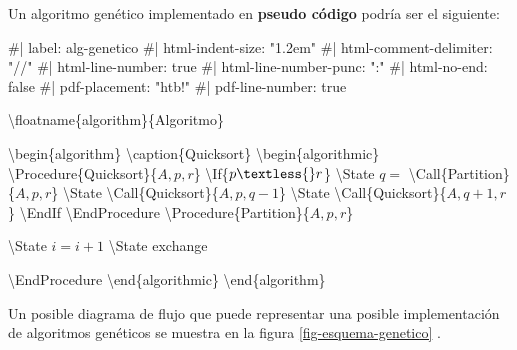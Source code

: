 \documentclass[
  a4paper,
  DIV=11,
  numbers=noendperiod]{scrreprt}
\newenvironment{Shaded}{\begin{snugshade}}{\end{snugshade}}
\newcommand{\NormalTok}[1]{#1}
\begin{document}
Un algoritmo genético implementado en \textbf{pseudo código} podría ser
el siguiente:

\begin{Shaded}
\begin{Highlighting}[numbers=left,,]
\NormalTok{\#| label: alg{-}genetico}
\NormalTok{\#| html{-}indent{-}size: "1.2em"}
\NormalTok{\#| html{-}comment{-}delimiter: "//"}
\NormalTok{\#| html{-}line{-}number: true}
\NormalTok{\#| html{-}line{-}number{-}punc: ":"}
\NormalTok{\#| html{-}no{-}end: false}
\NormalTok{\#| pdf{-}placement: "htb!"}
\NormalTok{\#| pdf{-}line{-}number: true}


\NormalTok{\textbackslash{}floatname\{algorithm\}\{Algoritmo\}}

\NormalTok{\textbackslash{}begin\{algorithm\}}
\NormalTok{\textbackslash{}caption\{Quicksort\}}
\NormalTok{\textbackslash{}begin\{algorithmic\}}
\NormalTok{\textbackslash{}Procedure\{Quicksort\}\{$A, p, r$\}}
\NormalTok{  \textbackslash{}If\{$p \textless{} r$\}}
\NormalTok{    \textbackslash{}State $q = $ \textbackslash{}Call\{Partition\}\{$A, p, r$\}}
\NormalTok{    \textbackslash{}State \textbackslash{}Call\{Quicksort\}\{$A, p, q {-} 1$\}}
\NormalTok{    \textbackslash{}State \textbackslash{}Call\{Quicksort\}\{$A, q + 1, r$\}}
\NormalTok{  \textbackslash{}EndIf}
\NormalTok{\textbackslash{}EndProcedure}
\NormalTok{\textbackslash{}Procedure\{Partition\}\{$A, p, r$\}}
 

\NormalTok{      \textbackslash{}State $i = i + 1$}
\NormalTok{      \textbackslash{}State exchange}

\NormalTok{\textbackslash{}EndProcedure}
\NormalTok{\textbackslash{}end\{algorithmic\}}
\NormalTok{\textbackslash{}end\{algorithm\}}
\end{Highlighting}
\end{Shaded}

Un posible diagrama de flujo que puede representar una posible
implementación de algoritmos genéticos se muestra en la figura
\ref{fig-esquema-genetico} .
\end{document}
